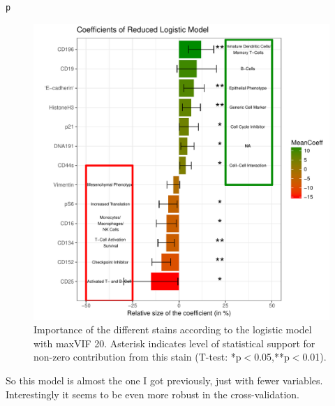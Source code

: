 \documentclass[a4paper]{article}\usepackage[]{graphicx}\usepackage[]{color}
\makeatletter
\def\maxwidth{ %
  \ifdim\Gin@nat@width>\linewidth
    \linewidth
  \else
    \Gin@nat@width
  \fi
}
\newcommand{\hlstd}[1]{\textcolor[rgb]{0.345,0.345,0.345}{#1}}%
\newenvironment{kframe}{%
 \def\at@end@of@kframe{}%
 \ifinner\ifhmode%
  \def\at@end@of@kframe{\end{minipage}}%
  \begin{minipage}{\columnwidth}%
 \fi\fi%
 \def\FrameCommand##1{\hskip\@totalleftmargin \hskip-\fboxsep
 \colorbox{shadecolor}{##1}\hskip-\fboxsep
     \hskip-\linewidth \hskip-\@totalleftmargin \hskip\columnwidth}%
 \MakeFramed {\advance\hsize-\width
   \@totalleftmargin\z@ \linewidth\hsize
   \@setminipage}}%
 {\par\unskip\endMakeFramed%
 \at@end@of@kframe}
\newenvironment{knitrout}{}{} %
\makeatother
\begin{document}
\begin{knitrout}
\begin{kframe}
\begin{alltt}
\hlstd{p}
\end{alltt}
\end{kframe}\begin{figure}[h]
\includegraphics[width=\maxwidth]{figure/Fig_Model20-1} \caption[Importance of the different stains according to the logistic model with maxVIF 20]{Importance of the different stains according to the logistic model with maxVIF 20. Asterisk indicates level of statistical support for non-zero contribution from this stain (T-test: *p$<$0.05,**p$<$0.01).}\label{fig:Fig_Model20}
\end{figure}


\end{knitrout}

So this model is almost the one I got previously, just with fewer variables. Interestingly it seems to be even more robust in the cross-validation.
\end{document}
